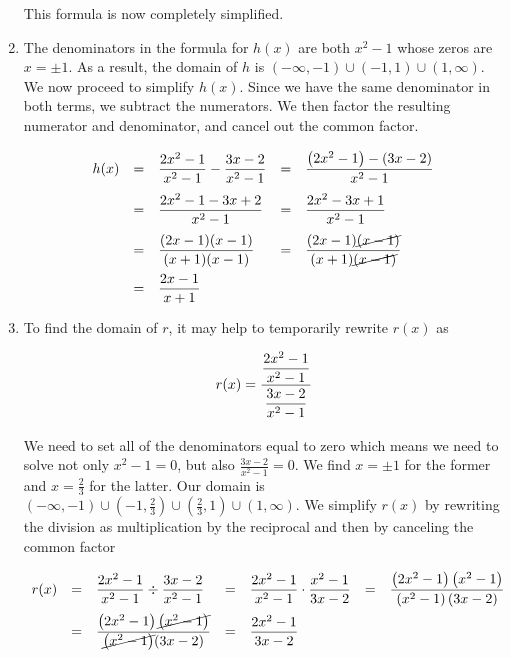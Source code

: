 \begin{ex}
\begin{enumerate}
This formula is now completely simplified.


\item  The denominators in the formula for $h(x)$ are both $x^2-1$ whose zeros are  $x = \pm 1$.  As a result, the domain of $h$ is $(-\infty, -1) \cup (-1,1) \cup (1, \infty)$.  We now proceed to simplify $h(x)$.  Since we have the same denominator in both terms, we subtract the numerators.  We then factor the resulting numerator and denominator, and cancel out the common factor.

\[ \begin{array}{rclcl}

h(x) & = & \dfrac{2x^2-1}{x^2-1} - \dfrac{3x-2}{x^2-1} & = & \dfrac{\left(2x^2-1\right) - \left(3x-2\right)}{x^2-1} \\ [.15in]
     & = & \dfrac{2x^2-1 - 3x+2}{x^2-1} & = &  \dfrac{2x^2 - 3x+1}{x^2-1} \\ [.15in]
     & = & \dfrac{(2x-1)(x-1)}{(x+1)(x-1)} & = & \dfrac{(2x-1)\cancel{(x-1)}}{(x+1)\cancel{(x-1)}} \\ [.15in]
     & = & \dfrac{2x-1}{x+1} & & \\
\end{array} \]

\item  To find the domain of $r$, it may help to temporarily rewrite $r(x)$ as

\[ r(x) = \dfrac{\dfrac{2x^2-1}{x^2-1} }{\dfrac{3x-2}{x^2-1}\vphantom{\left(\dfrac{X}{X}\right)}}\]

We need to set all of the denominators equal to zero which means we need to solve not only  $x^2-1= 0$, but also $\frac{3x-2}{x^2-1}=0$.  We find $x = \pm 1$ for the former and $x= \frac{2}{3}$ for the latter.  Our domain is $(-\infty, -1) \cup \left(-1,\frac{2}{3}\right) \cup \left(\frac{2}{3},1\right) \cup (1, \infty)$.  We simplify $r(x)$ by rewriting the division as multiplication by the reciprocal and then by canceling the common factor

\[ \begin{array}{rclclcl}

r(x) & = & \dfrac{2x^2-1}{x^2-1} \div \dfrac{3x-2}{x^2-1} & = & \dfrac{2x^2-1}{x^2-1} \cdot \dfrac{x^2-1}{3x-2} & = & \dfrac{\left(2x^2-1\right)\left(x^2-1\right)}{\left(x^2-1\right)(3x-2)} \\ [.15in]
     & = & \dfrac{\left(2x^2-1\right)\cancel{\left(x^2-1\right)}}{\cancel{\left(x^2-1\right)}(3x-2)} & = & \dfrac{2x^2-1}{3x-2} & & \\ 
\end{array}\]

\end{enumerate}

\end{ex}

